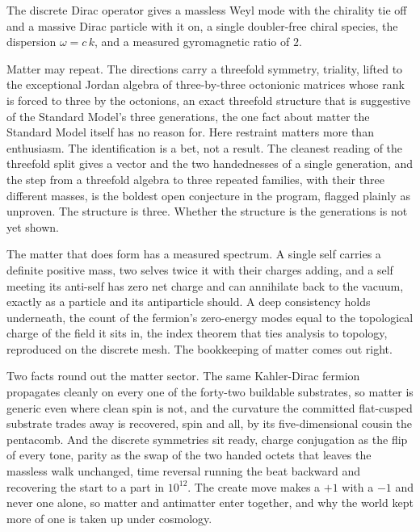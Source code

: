 \begin{result}
The discrete Dirac operator gives a massless Weyl mode with the chirality tie off and a massive Dirac particle with it on, a single doubler-free chiral species, the dispersion $\omega = c\,k$, and a measured gyromagnetic ratio of $2$. \cite{pollard2026vibetest}
\end{result}

Matter may repeat. The directions carry a threefold symmetry, triality, lifted to the exceptional Jordan algebra of three-by-three octonionic matrices whose rank is forced to three by the octonions, an exact threefold structure that is suggestive of the Standard Model's three generations, the one fact about matter the Standard Model itself has no reason for. Here restraint matters more than enthusiasm. The identification is a bet, not a result. The cleanest reading of the threefold split gives a vector and the two handednesses of a single generation, and the step from a threefold algebra to three repeated families, with their three different masses, is the boldest open conjecture in the program, flagged plainly as unproven. The structure is three. Whether the structure is the generations is not yet shown.

The matter that does form has a measured spectrum. A single self carries a definite positive mass, two selves twice it with their charges adding, and a self meeting its anti-self has zero net charge and can annihilate back to the vacuum, exactly as a particle and its antiparticle should. A deep consistency holds underneath, the count of the fermion's zero-energy modes equal to the topological charge of the field it sits in, the index theorem that ties analysis to topology, reproduced on the discrete mesh. The bookkeeping of matter comes out right.

Two facts round out the matter sector. The same Kahler-Dirac fermion propagates cleanly on every one of the forty-two buildable substrates, so matter is generic even where clean spin is not, and the curvature the committed flat-cusped substrate trades away is recovered, spin and all, by its five-dimensional cousin the pentacomb. And the discrete symmetries sit ready, charge conjugation as the flip of every tone, parity as the swap of the two handed octets that leaves the massless walk unchanged, time reversal running the beat backward and recovering the start to a part in $10^{12}$. The create move makes a $+1$ with a $-1$ and never one alone, so matter and antimatter enter together, and why the world kept more of one is taken up under cosmology.

